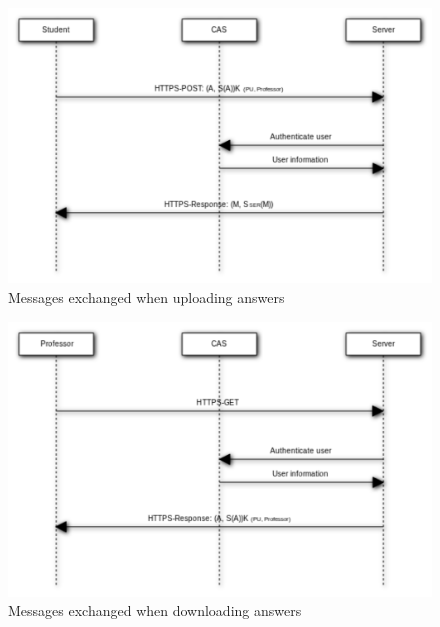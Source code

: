 \documentclass{article}
\begin{document}
\begin{figure}
\begin{center}
\includegraphics[width=\textwidth]{images/upload_answers.pdf}
\caption{Messages exchanged when uploading answers}
\label{fig:log-in}
\end{center}
\end{figure}

\begin{figure}
\begin{center}
\includegraphics[width=\textwidth]{images/download_answers.pdf}
\caption{Messages exchanged when downloading answers}
\label{fig:log-in}
\end{center}
\end{figure}
\end{document}
